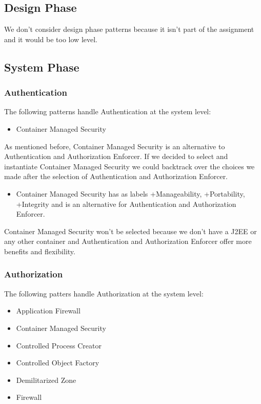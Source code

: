 \documentclass[a4paper,11pt]{report}
\begin{document}
\subsection{Design Phase}
We don't consider design phase patterns because it isn't part of the assignment and it would be too
low level.

\subsection{System Phase}

\subsubsection{Authentication}
The following patterns handle Authentication at the system level:
\begin{itemize}
\item Container Managed Security
\end{itemize}

As mentioned before, Container Managed Security is an alternative to Authentication and Authorization Enforcer.
If we decided to select and instantiate Container Managed Security we could backtrack over the choices we made
after the selection of Authentication and Authorization Enforcer.

\begin{itemize}
\item Container Managed Security has as labels +Manageability, +Portability, +Integrity and is an alternative for
Authentication and Authorization Enforcer.
\end{itemize}

Container Managed Security won't be selected because we don't have a J2EE or any other container and Authentication
and Authorization Enforcer offer more benefits and flexibility.

\subsubsection{Authorization}
The following patters handle Authorization at the system level:
\begin{itemize}
\item Application Firewall
\item Container Managed Security
\item Controlled Process Creator
\item Controlled Object Factory
\item Demilitarized Zone
\item Firewall
\end{itemize}
\end{document}
